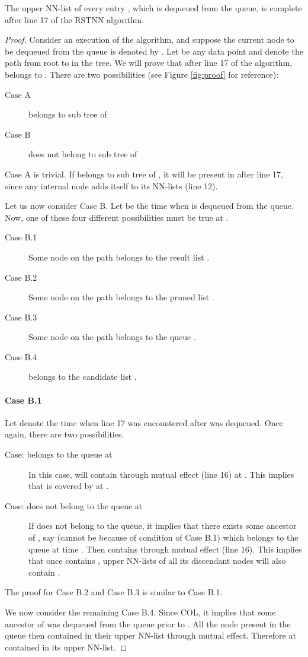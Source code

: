 \documentclass[prodmode,letterpaper]{acmsmall}
\newcommand{\rstknn}{RSTNN\xspace}
\begin{document}
\begin{lemma}\label{lemma:proof-3}
The upper NN-list of every entry , which is dequeued from the queue, is complete after line 17 of the \rstknn algorithm.
\end{lemma}
\begin{proof}
Consider an execution of the algorithm, and suppose the current node to be
dequeued from the queue is denoted by . Let  be any data point and 
denote the path from root to  in the tree.
We will prove that after line 17 of the
algorithm,  belongs to . 
There are two
possibilities (see Figure \ref{fig:proof} for reference):
\begin{description}
    \item [Case A]  belongs to sub tree of 
    \item [Case B]  does not belong to sub tree of 
\end{description}

Case A is trivial. If  belongs to sub tree of , it will be present in
 after line 17, since any internal node adds itself to its NN-lists
(line 12).

Let us now consider Case B.
Let  be the time when  is dequeued from the queue.
Now, one of these four different possibilities must be true at .
\begin{description}
    \item[Case B.1] Some node  on the path  belongs to the result list
	.
    \item[Case B.2] Some node  on the path  belongs to the pruned list
	.
    \item[Case B.3] Some node  on the path  belongs to the queue .
    \item[Case B.4]  belongs to the candidate list .
\end{description}
\paragraph{Case B.1}
Let  denote the time when line 17 was encountered after  was dequeued. Once again, there are two
possibilities.
\begin{description}
    \item[Case:  belongs to the queue at ] In this case,  will contain
	 through mutual effect (line 16) at . This implies
	that  is covered by  at .
    \item [Case:  does not belong to the queue at ]
If  does not belong to the queue, it implies that there exists some ancestor
of , say  (cannot be  because of condition of Case B.1) which
belongs to the queue at time . Then  contains  through
mutual effect (line 16). This implies that once
 contains , upper NN-lists of all its discendant nodes will also contain
.
\end{description}
The proof for Case B.2 and Case B.3 is similar to Case B.1.

We now consider the remaining Case B.4. Since  COL, it implies that
some ancestor  of  was dequeued from the queue prior to . All the
node present in the queue then contained  in their upper NN-list through
mutual effect. Therefore at   contained  in its
upper NN-list.
\end{proof}
\end{document}
